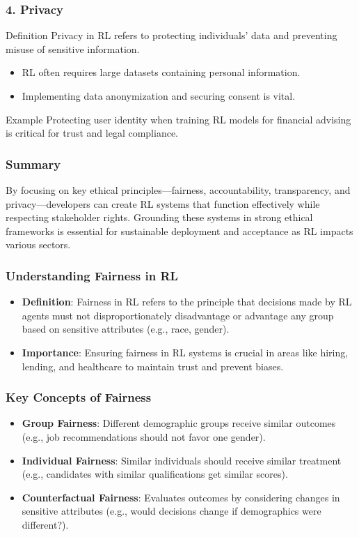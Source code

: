 \documentclass[aspectratio=169]{beamer}
\begin{document}
\begin{frame}[fragile]
  \frametitle{4. Privacy}
  \begin{block}{Definition}
    Privacy in RL refers to protecting individuals' data and preventing misuse of sensitive information.
  \end{block}
  \begin{itemize}
    \item RL often requires large datasets containing personal information.
    \item Implementing data anonymization and securing consent is vital.
  \end{itemize}
  \begin{block}{Example}
    Protecting user identity when training RL models for financial advising is critical for trust and legal compliance.
  \end{block}
\end{frame}

\begin{frame}[fragile]
  \frametitle{Summary}
  By focusing on key ethical principles—fairness, accountability, transparency, and privacy—developers can create RL systems that function effectively while respecting stakeholder rights. Grounding these systems in strong ethical frameworks is essential for sustainable deployment and acceptance as RL impacts various sectors.
\end{frame}

\begin{frame}[fragile]
    \frametitle{Understanding Fairness in RL}
    \begin{itemize}
        \item \textbf{Definition}: Fairness in RL refers to the principle that decisions made by RL agents must not disproportionately disadvantage or advantage any group based on sensitive attributes (e.g., race, gender).
        \item \textbf{Importance}: Ensuring fairness in RL systems is crucial in areas like hiring, lending, and healthcare to maintain trust and prevent biases.
    \end{itemize}
\end{frame}

\begin{frame}[fragile]
    \frametitle{Key Concepts of Fairness}
    \begin{itemize}
        \item \textbf{Group Fairness}: Different demographic groups receive similar outcomes (e.g., job recommendations should not favor one gender).
        \item \textbf{Individual Fairness}: Similar individuals should receive similar treatment (e.g., candidates with similar qualifications get similar scores).
        \item \textbf{Counterfactual Fairness}: Evaluates outcomes by considering changes in sensitive attributes (e.g., would decisions change if demographics were different?).
    \end{itemize}
\end{frame}
\end{document}
